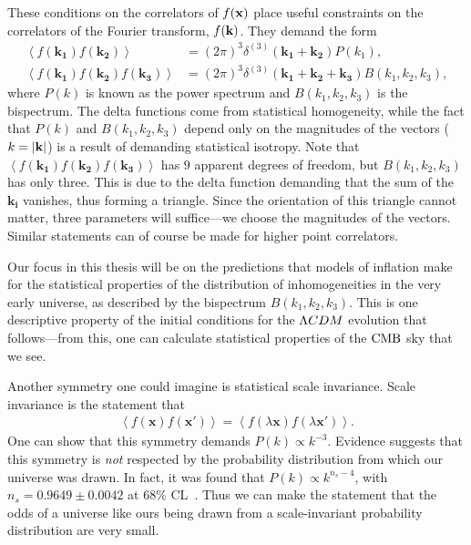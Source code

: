     These conditions on the correlators of $f(\mathbf{x})$ place useful constraints on the correlators of the
    Fourier transform, $f(\mathbf{k})$. They demand the form
    \begin{align}\label{spectrum_definitions}
        \left<f(\mathbf{k_1})f(\mathbf{k_2})\right> &= (2\pi)^3\delta^{(3)}(\mathbf{k_1}+\mathbf{k_2})P(k_1),\\
        \left<f(\mathbf{k_1})f(\mathbf{k_2})f(\mathbf{k_3})\right> &= (2\pi)^3\delta^{(3)}(\mathbf{k_1}+\mathbf{k_2}+\mathbf{k_3})B(k_1,k_2,k_3),
    \end{align}
    where $P(k)$ is known as the power spectrum and $B(k_1,k_2,k_3)$ is the bispectrum.
    The delta functions come from statistical homogeneity, while the fact that $P(k)$
    and $B(k_1,k_2,k_3)$ depend only on the magnitudes of the vectors ($k=\left|\mathbf{k}\right|$) is a result
    of demanding statistical isotropy.
    Note that $\left<f(\mathbf{k_1})f(\mathbf{k_2})f(\mathbf{k_3})\right>$
    has $9$ apparent degrees of freedom, but $B(k_1,k_2,k_3)$ has only three.
    This is due to the delta function
    demanding that the sum of the $\mathbf{k_i}$ vanishes, thus forming a triangle.
    Since the orientation of this triangle
    cannot matter, three parameters will suffice---we choose the magnitudes of the vectors.
    Similar statements can of course be made for higher point correlators.


    Our focus in this thesis will be on the predictions that models of inflation make
    for the statistical properties of the distribution of
    inhomogeneities in the very early universe, as described by the bispectrum $B(k_1,k_2,k_3)$.
    This is one descriptive property of 
    the initial conditions for the $\Lambda CDM$ evolution that follows---from
    this, one can calculate statistical properties of the $\text{CMB}$ sky that we see.


    Another symmetry one could imagine is statistical scale invariance.
    Scale invariance is the statement that
    \begin{align}
        \left<f(\mathbf{x})f(\mathbf{x'})\right> = \left<f(\lambda\mathbf{x})f(\lambda\mathbf{x'})\right>.
    \end{align}
    One can show that this symmetry demands $P(k)\propto k^{-3}$.
    Evidence suggests that this symmetry is \textit{not} respected by the probability
    distribution from which our universe was drawn.
    In fact, it was found that $P(k)\propto k^{n_s-4}$, with $n_s=0.9649 \pm 0.0042$
    at $68\%$ CL~\cite{Planck_inflation_2015, Planck_inflation_2018}.
    Thus we can make the statement that
    the odds of a universe like ours being drawn from a scale-invariant probability
    distribution are very small.


